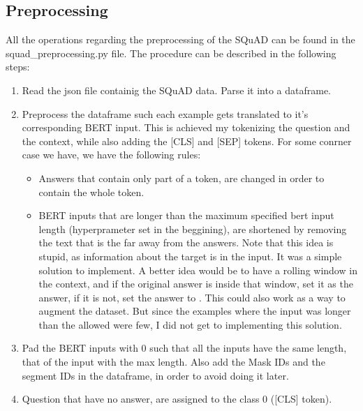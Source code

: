 \documentclass[12pt]{report}
\begin{document}
\subsection*{Preprocessing}
All the operations regarding the preprocessing of the SQuAD can be found in the
squad\_preprocessing.py file. The procedure can be described in the following steps:
\begin{enumerate}
    \item Read the json file containig the SQuAD data. Parse it into a dataframe.
    \item Preprocess the dataframe such each example gets translated to it's
        corresponding BERT input. This is achieved my tokenizing the question
        and the context, while also adding the [CLS] and [SEP] tokens. For some conrner
        case we have, we have the following rules:
        \begin{itemize}
            \item Answers that contain only part of a token, are changed in order to contain
                the whole token.
            \item BERT inputs that are longer than the maximum specified bert input length
                (hyperprameter set in the beggining), are shortened by removing the text that
                is the  far away from the answers. Note that this idea is
                stupid, as information about the target is  in the input.
                It was a simple solution to implement. A better idea would be to have a rolling
                window in the context, and if the original answer is inside that window, set it
                as the answer, if it is not, set the answer to . This
                could also work as a way to augment the dataset. But since the examples where
                the input was longer than the allowed were few, I did not get to implementing
                this solution.
        \end{itemize}
    \item Pad the BERT inputs with 0 such that all the inputs have the same length, that of
        the input with the max length. Also add the Mask IDs and the segment IDs in the
        dataframe, in order to avoid doing it later.
    \item Question that have no answer, are assigned to the class 0 ([CLS] token).
\end{enumerate} \clearpage
\end{document}
